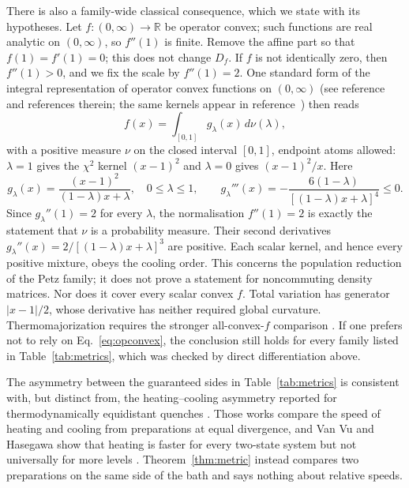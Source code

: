 \documentclass[11pt,a4paper]{article}
\theoremstyle{remark}\newtheorem{remark}[theorem]{Remark}
\newcommand{\R}{\mathbb R}
\begin{document}
There is also a family-wide classical consequence, which we state with its hypotheses. Let $f:(0,\infty)\to\R$ be operator convex; such functions are real analytic on $(0,\infty)$, so $f''(1)$ is finite. Remove the affine part so that $f(1)=f'(1)=0$; this does not change $D_f$. If $f$ is not identically zero, then $f''(1)>0$, and we fix the scale by $f''(1)=2$. One standard form of the integral representation of operator convex functions on $(0,\infty)$ (see reference~\cite{Hiai2017} and references therein; the same kernels appear in reference~\cite{Salazar2026}) then reads
\begin{equation}
 f(x)=\int_{[0,1]}g_\lambda(x)\,d\nu(\lambda),
 \label{eq:opconvex}
\end{equation}
with a positive measure $\nu$ on the closed interval $[0,1]$, endpoint atoms allowed: $\lambda=1$ gives the $\chi^2$ kernel $(x-1)^2$ and $\lambda=0$ gives $(x-1)^2/x$. Here
\begin{equation}
 g_\lambda(x)=\frac{(x-1)^2}{(1-\lambda)x+\lambda},\quad0\le\lambda\le1,
 \qquad
 g_\lambda'''(x)=-\frac{6(1-\lambda)}{[(1-\lambda)x+\lambda]^4}\le0.
 \label{eq:petz}
\end{equation}
Since $g_\lambda''(1)=2$ for every $\lambda$, the normalisation $f''(1)=2$ is exactly the statement that $\nu$ is a probability measure. Their second derivatives $g_\lambda''(x)=2/[(1-\lambda)x+\lambda]^3$ are positive. Each scalar kernel, and hence every positive mixture, obeys the cooling order. This concerns the population reduction of the Petz family; it does not prove a statement for noncommuting density matrices. Nor does it cover every scalar convex $f$. Total variation has generator $|x-1|/2$, whose derivative has neither required global curvature. Thermomajorization requires the stronger all-convex-$f$ comparison \cite{Vu2025}. If one prefers not to rely on Eq.~\eqref{eq:opconvex}, the conclusion still holds for every family listed in Table~\ref{tab:metrics}, which was checked by direct differentiation above.

The asymmetry between the guaranteed sides in Table~\ref{tab:metrics} is consistent with, but distinct from, the heating--cooling asymmetry reported for thermodynamically equidistant quenches \cite{Lapolla2020,VanVu2021,Ibanez2024}. Those works compare the speed of heating and cooling from preparations at equal divergence, and Van Vu and Hasegawa show that heating is faster for every two-state system but not universally for more levels \cite{VanVu2021}. Theorem~\ref{thm:metric} instead compares two preparations on the same side of the bath and says nothing about relative speeds.
\end{document}
